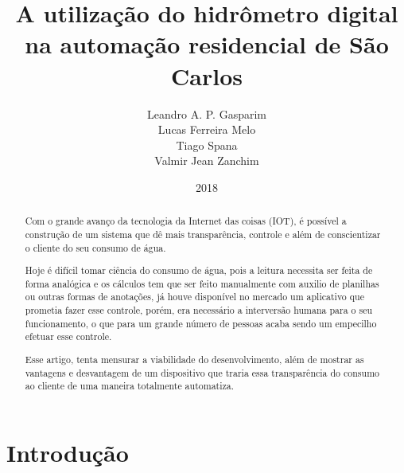 \documentclass[
	article,			%
	11pt,				%
	oneside,			%
	a4paper,			%
	english,			%
	brazil,				%
	sumario=tradicional
	]{abntex2}
\title{A utilização do hidrômetro digital na automação residencial de São Carlos}
\author{
    Leandro A. P. Gasparim \\
    Lucas Ferreira Melo \\
    Tiago Spana \\
    Valmir Jean Zanchim \\
}
\date{2018}
\begin{document}
\maketitle

\begin{abstract}
   
    Com o grande avanço da tecnologia da Internet das coisas (IOT), é possível a construção de um sistema que dê mais transparência, controle  e além de conscientizar o cliente do seu consumo de água.
    
    Hoje é difícil tomar ciência do consumo de água, pois a leitura necessita ser feita de forma analógica e os cálculos tem que ser feito manualmente com auxilio de planilhas ou outras formas de anotações, já houve disponível no mercado um aplicativo que prometia fazer esse controle, porém, era necessário a interversão humana para o seu funcionamento, o que para um grande número de pessoas acaba sendo um empecilho efetuar esse controle.
    
    Esse artigo, tenta mensurar a viabilidade do desenvolvimento, além de mostrar as vantagens e desvantagem de um dispositivo que traria essa transparência do consumo ao cliente de uma maneira totalmente automatiza. 
    
\end{abstract}

\section{Introdução}
\end{document}
